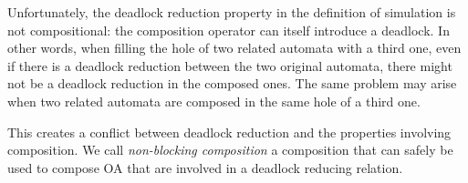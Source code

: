 \documentclass[runningheads]{llncs}
\begin{document}
Unfortunately, the deadlock reduction property in the definition of simulation is not compositional: the composition operator can itself introduce a deadlock. In other words, when filling the hole of two related automata with a third one, even if there is a deadlock reduction between the two original automata, there might not be a deadlock reduction in the composed ones. The same problem may arise when two related automata are composed in the same hole of a third one. 

This creates a conflict between deadlock reduction and the properties involving composition. 
We call \emph{non-blocking composition} a composition that can  safely be used to compose OA that are involved in a deadlock reducing relation.
\end{document}
